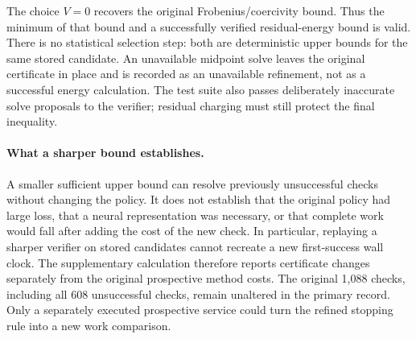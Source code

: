 The choice $V=0$ recovers the original Frobenius/coercivity bound. Thus the
minimum of that bound and a successfully verified residual-energy bound is
valid. There is no statistical selection step: both are deterministic upper
bounds for the same stored candidate. An unavailable midpoint solve leaves
the original certificate in place and is recorded as an unavailable
refinement, not as a successful energy calculation. The test suite also
passes deliberately inaccurate solve proposals to the verifier; residual
charging must still protect the final inequality.

\paragraph{What a sharper bound establishes.}
A smaller sufficient upper bound can resolve previously unsuccessful checks
without changing the policy. It does not establish that the original policy
had large loss, that a neural representation was necessary, or that complete
work would fall after adding the cost of the new check. In particular,
replaying a sharper verifier on stored candidates cannot recreate a new
first-success wall clock. The supplementary calculation therefore reports
certificate changes separately from the original prospective method costs.
The original 1,088 checks, including all 608 unsuccessful checks, remain
unaltered in the primary record. Only a separately executed prospective
service could turn the refined stopping rule into a new work comparison.
